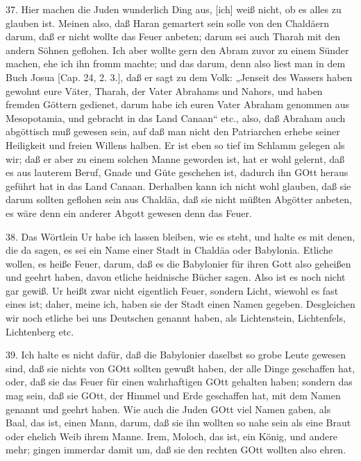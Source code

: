 37. Hier machen die Juden wunderlich Ding aus, [ich] weiß nicht, ob es alles zu glauben ist. Meinen also, daß Haran gemartert sein solle von den Chaldäern darum, daß er nicht wollte das Feuer anbeten; darum sei auch Tharah mit den andern Söhnen geflohen. Ich aber wollte gern den Abram zuvor zu einem Sünder machen, ehe ich ihn fromm machte; und das darum, denn also liest man in dem Buch Josua [Cap. 24, 2. 3.], daß er sagt zu dem Volk: „Jenseit des Wassers haben gewohnt eure Väter, Tharah, der Vater Abrahams und Nahors, und haben fremden Göttern gedienet, darum habe ich euren Vater Abraham genommen aus Mesopotamia, und gebracht in das Land Canaan“ etc., also, daß Abraham auch abgöttisch muß gewesen sein, auf daß man nicht den Patriarchen erhebe seiner Heiligkeit und freien Willens halben. Er ist eben so tief im Schlamm gelegen als wir; daß er aber zu einem solchen Manne geworden ist, hat er wohl gelernt, daß es aus lauterem Beruf, Gnade und Güte geschehen ist, dadurch ihn GOtt heraus geführt hat in das Land Canaan. Derhalben kann ich nicht wohl glauben, daß sie darum sollten geflohen sein aus Chaldäa, daß sie nicht müßten Abgötter anbeten, es wäre denn ein anderer Abgott gewesen denn das Feuer.

38. Das Wörtlein Ur habe ich lassen bleiben, wie es steht, und halte es mit denen, die da sagen, es sei ein Name einer Stadt in Chaldäa oder Babylonia. Etliche wollen, es heiße Feuer, darum, daß es die Babylonier für ihren Gott also geheißen und geehrt haben, davon etliche heidnische Bücher sagen. Also ist es noch nicht gar gewiß. Ur heißt zwar nicht eigentlich Feuer, sondern Licht, wiewohl es fast eines ist; daher, meine ich, haben sie der Stadt einen Namen gegeben. Desgleichen wir noch etliche bei uns Deutschen genannt haben, als Lichtenstein, Lichtenfels, Lichtenberg etc.

39. Ich halte es nicht dafür, daß die Babylonier daselbst so grobe Leute gewesen sind, daß sie nichts von GOtt sollten gewußt haben, der alle Dinge geschaffen hat, oder, daß sie das Feuer für einen wahrhaftigen GOtt gehalten haben; sondern das mag sein, daß sie GOtt, der Himmel und Erde geschaffen hat, mit dem Namen genannt und geehrt haben. Wie auch die Juden GOtt viel Namen gaben, als Baal, das ist, einen Mann, darum, daß sie ihn wollten so nahe sein als eine Braut oder ehelich Weib ihrem Manne. Irem, Moloch, das ist, ein König, und andere mehr; gingen immerdar damit um, daß sie den rechten GOtt wollten also ehren.

